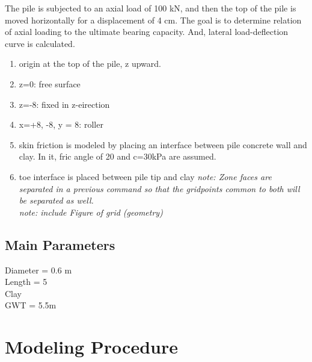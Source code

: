 \documentclass[a4paper, nobind]{templates/ociamthesis}
\providecommand{\tightlist}{%
  \setlength{\itemsep}{0pt}\setlength{\parskip}{0pt}}
\begin{document}
The pile is subjected to an axial load of 100 kN,
and then the top of the pile is moved horizontally for a displacement of 4 cm.
The goal is to determine relation of axial loading to the ultimate bearing capacity.
And, lateral load-deflection curve is calculated.

\begin{enumerate}
\def\labelenumi{\arabic{enumi})}
\tightlist
\item
  origin at the top of the pile, z upward.
\item
  z=0: free surface
\item
  z=-8: fixed in z-eirection
\item
  x=+8, -8, y = 8: roller
\item
  skin friction is modeled by placing an interface
  between pile concrete wall and clay.
  In it, fric angle of 20 and c=30kPa are assumed.
\item
  toe interface is placed between pile tip and clay
  \emph{note: Zone faces are separated in a previous command so that the gridpoints common to both will be separated as well.}\\
  \emph{note: include Figure of grid (geometry)}
\end{enumerate}

\hypertarget{main-parameters}{%
\subsection{Main Parameters}\label{main-parameters}}

Diameter = 0.6 m\\
Length = 5\\
Clay\\
GWT = 5.5m\\

\hypertarget{modeling-procedure}{%
\section{Modeling Procedure}\label{modeling-procedure}}
\end{document}
